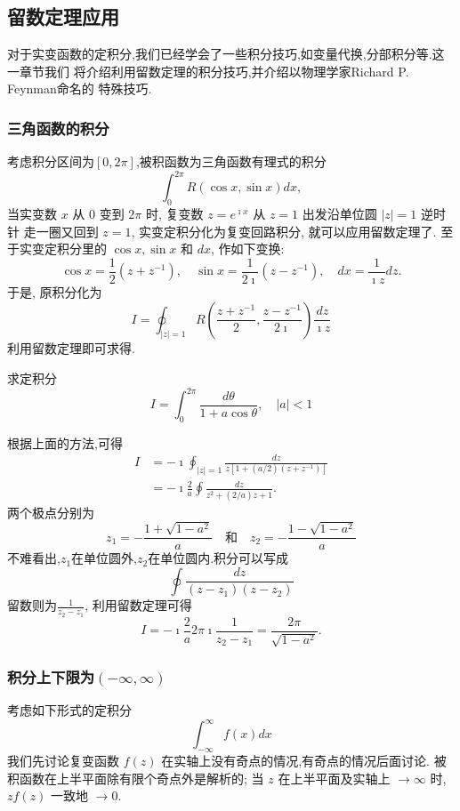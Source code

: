 \subsection{留数定理应用}
对于实变函数的定积分,我们已经学会了一些积分技巧,如变量代换,分部积分等.这一章节我们
将介绍利用留数定理的积分技巧,并介绍以物理学家Richard P. Feynman命名的
特殊技巧.
\subsubsection{三角函数的积分}
考虑积分区间为$\left[ 0, 2\pi \right]$,被积函数为三角函数有理式的积分
\begin{equation}
    \int_{0}^{2\pi} R(\cos{x}, \sin{x}) dx,
\end{equation}
当实变数 $x$ 从 0 变到 $2 \pi$ 时, 复变数 $z=e^{\imath x}$ 从 $z=1$ 出发沿单位圆 $|z|=1$ 逆时针 走一圈又回到 $z=1$,
实变定积分化为复变回路积分, 就可以应用留数定理了. 至于实变定积分里的 $\cos x, \sin x$ 和 $d x$, 作如下变换:
$$
\cos x=\frac{1}{2}\left(z+z^{-1}\right), \quad \sin x=\frac{1}{2 \imath}\left(z-z^{-1}\right), \quad d x=\frac{1}{\imath z} d z .
$$
于是, 原积分化为
$$
I=\oint_{|z|=1} R\left(\frac{z+z^{-1}}{2}, \frac{z-z^{-1}}{2 \imath}\right) \frac{d z}{\imath z}
$$
利用留数定理即可求得.

\begin{example}
求定积分\[I=\int_0^{2 \pi} \frac{d \theta}{1+a \cos \theta}, \quad|a|<1 \]
\end{example}
\begin{solution}
    根据上面的方法,可得
    \[
        \begin{aligned}
        I & =-\imath \oint_{|z|=1} \frac{d z}{z\left[1+(a / 2)\left(z+z^{-1}\right)\right]} \\
        & =-\imath \frac{2}{a} \oint \frac{d z}{z^2+(2 / a) z+1} .
        \end{aligned}
    \]
    两个极点分别为
    \[
        z_1=-\frac{1+\sqrt{1-a^2}}{a} \quad \text {和} \quad z_2=-\frac{1-\sqrt{1-a^2}}{a}
    \]
    不难看出,$z_1$在单位圆外,$z_2$在单位圆内.积分可以写成
    \[
      \oint \frac{dz}{(z-z_1)(z-z_2)}   
    \]
    留数则为$\frac{1}{z_2 - z_1}$, 利用留数定理可得 
    \[
      I=  -\imath \frac{2}{a} 2\pi\imath \frac{1}{z_2 - z_1} = \frac{2 \pi }{\sqrt{1 - a^2}} . 
    \]
\end{solution}



\subsubsection{积分上下限为$( -\infty, \infty)$}
 考虑如下形式的定积分
 \[
    \int_{-\infty}^{\infty} f(x) dx
 \]
 我们先讨论复变函数 $f(z)$ 在实轴上没有奇点的情况,有奇点的情况后面讨论. 
被积函数在上半平面除有限个奇点外是解析的; 当 $z$ 在上半平面及实轴上 $\to \infty$ 时, 
$z f(z)$ 一致地 $\to 0$.

